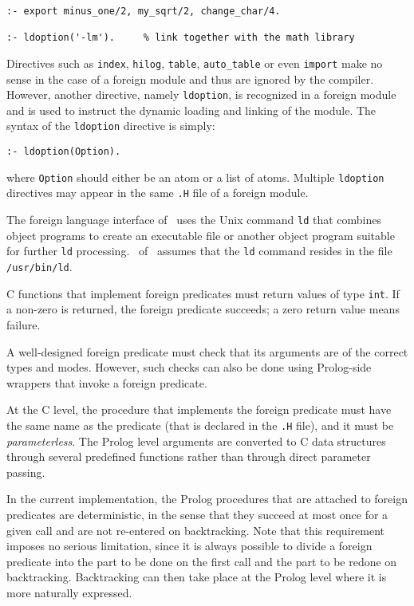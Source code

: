 \begin{verbatim}
:- export minus_one/2, my_sqrt/2, change_char/4.

:- ldoption('-lm').     % link together with the math library
\end{verbatim}

Directives such as {\tt index}, {\tt hilog}, {\tt table}, {\tt auto\_table} 
or even {\tt import} make no sense in the case of a foreign module and thus 
are ignored by the compiler.  However, another directive, namely 
{\tt ldoption}, is recognized in a foreign module and is used to instruct 
the dynamic loading and linking of the module.  
The syntax of the {\tt ldoption} directive is simply:
\begin{center}
{\tt  :- ldoption(Option).    }
\end{center}
where {\tt Option} should either be an atom or a list of atoms.  Multiple
{\tt ldoption} directives may appear in the same {\tt .H} file of a foreign
module.

The foreign language interface of \ourprolog\ uses the Unix command 
{\tt ld} that combines object programs to create an executable file  
or another object program suitable for further {\tt ld} processing.
\version\ of \ourprolog\ assumes that the {\tt ld} command resides
in the file {\tt /usr/bin/ld}.

C functions that implement foreign predicates must return values of type
{\tt int}. If a non-zero is returned, the foreign predicate succeeds; a
zero return value means failure.

A well-designed foreign predicate must check that its arguments are of the
correct types and modes. However, such checks can also be done using
Prolog-side wrappers that invoke a foreign predicate.

At the C level, the procedure that implements the foreign predicate
must have the same name as the predicate (that is declared in the 
{\tt *.H} file), and it must be {\em parameterless}.  The Prolog level 
arguments are converted to C data structures through several 
predefined functions rather than through direct parameter passing.


In the current implementation, the Prolog procedures that are
attached to foreign predicates are deterministic, in the sense that
they succeed at most once for a given call and are not re-entered on
backtracking.  Note that this requirement imposes no serious
limitation, since it is always possible to divide a foreign predicate
into the part to be done on the first call and the part to be redone
on backtracking.  Backtracking can then take place at the Prolog
level where it is more naturally expressed.

